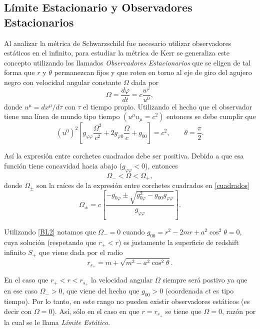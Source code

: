 \subsection{L\'imite Estacionario y Observadores Estacionarios}

Al analizar la m\'etrica de Schwarzschild fue necesario utilizar observadores est\'aticos en el infinito, para estudiar la m\'etrica de Kerr se generaliza este concepto utilizando los llamados \textit{Observadores Estacionarios} que se eligen de tal forma que $r$ y $\theta$ permanezcan fijos
y que roten en torno al eje de giro del agujero negro con velocidad angular constante $\Omega$ dada por
\begin{equation}
\Omega=\frac{d\varphi}{dt}=c\frac{u^{\varphi}}{u^{0}},
\end{equation}
donde $u^{\mu}=dx^{\mu}/d\tau$ con $\tau$ el tiempo propio. Utilizando el hecho que el observador tiene una l\'inea de mundo tipo tiempo $(u^{\mu}u_{\mu}=c^2)$ entonces se debe cumplir que
\begin{equation}\label{cuadrados}
\left(u^{0}\right)^2\left[g_{\varphi \varphi}\frac{\Omega^2}{c^2}+2g_{\varphi 0}\frac{\Omega}{c} +g_{00}\right]=c^2, \qquad \theta=\frac{\pi}{2}.
\end{equation}

As\'i la expresi\'on entre corchetes cuadrados debe ser positiva. Debido  a que esa funci\'on tiene concavidad hacia abajo ($g_{\varphi \varphi}<0$), entonces 
\begin{equation}
\Omega_{-}<\Omega <\Omega_{+},
\end{equation}
donde $\Omega_{\pm}$ son la ra\'ices de la expresi\'on entre corchetes cuadrados en \eqref{cuadrados}
\begin{equation}\label{roots}
\Omega_{\pm}= c\left[ \frac{-g_{0\varphi}\pm\sqrt{g_{0\varphi}^2-g_{00}g_{\varphi \varphi}}}{g_{\varphi \varphi}} \right].
\end{equation}

Utilizando \eqref{BL2} notamos que $\Omega_{-}=0$ cuando $g_{00}=r^2-2mr+a^2\cos^2 \theta=0$, cuya soluci\'on (respetando que $r_+<r$) es justamente la superficie de redshift infinito $S_{+}$ que viene dada por el radio
\begin{equation}
r_{s_+}=m+\sqrt{m^2-a^2\cos^2\theta}.
\end{equation}

En el caso que $r_+<r<r_{s_+}$ la velocidad angular $\Omega$ siempre ser\'a postivo ya que en ese caso $\Omega_{-}>0$, que viene del hecho que $g_{00}>0$ (coordenada $ct$ es tipo tiempo). Por lo tanto, en este rango no pueden existir observadores est\'aticos (es decir con $\Omega=0$). As\'i, s\'olo en el caso en que $r=r_{s_+}$ se tiene que $\Omega=0$, raz\'on por la cual se le llama \textit{L\'imite Est\'atico}.\\

